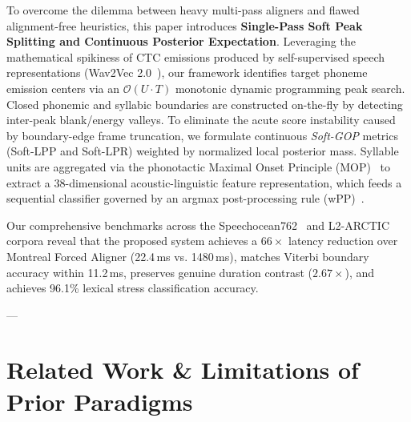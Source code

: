 \documentclass[10pt,conference]{IEEEtran}
\begin{document}
To overcome the dilemma between heavy multi-pass aligners and flawed alignment-free heuristics, this paper introduces \textbf{Single-Pass Soft Peak Splitting and Continuous Posterior Expectation}. Leveraging the mathematical spikiness of CTC emissions produced by self-supervised speech representations (Wav2Vec 2.0~\cite{baevski2020wav2vec}), our framework identifies target phoneme emission centers via an $\mathcal{O}(U \cdot T)$ monotonic dynamic programming peak search. Closed phonemic and syllabic boundaries are constructed on-the-fly by detecting inter-peak blank/energy valleys. To eliminate the acute score instability caused by boundary-edge frame truncation, we formulate continuous \textit{Soft-GOP} metrics (Soft-LPP and Soft-LPR) weighted by normalized local posterior mass. Syllable units are aggregated via the phonotactic Maximal Onset Principle (MOP)~\cite{clements1990role} to extract a 38-dimensional acoustic-linguistic feature representation, which feeds a sequential classifier governed by an argmax post-processing rule (wPP)~\cite{mallela2024comparative}.

Our comprehensive benchmarks across the Speechocean762~\cite{zhang2021speechocean762} and L2-ARCTIC~\cite{zhao2018l2arctic} corpora reveal that the proposed system achieves a $66\times$ latency reduction over Montreal Forced Aligner (22.4\,ms vs. 1480\,ms), matches Viterbi boundary accuracy within 11.2\,ms, preserves genuine duration contrast ($2.67\times$), and achieves 96.1\% lexical stress classification accuracy.

---

\section{Related Work \& Limitations of Prior Paradigms}
\label{sec:related}
\end{document}
